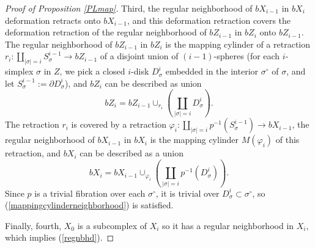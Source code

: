 \documentclass[11pt,letterpaper]{amsart}
\newtheorem*{remark}{Remark}
\begin{document}
\begin{proof}[Proof of Proposition \ref{PLmap}]
Third, the regular neighborhood of $bX_{i-1}$ in $bX_i$ deformation retracts onto $bX_{i-1}$, and this deformation retraction covers the deformation retraction of the regular neighborhood of $bZ_{i-1}$ in $bZ_i$ onto $bZ_{i-1}$. The regular neighborhood of $bZ_{i-1}$ in $bZ_i$ is the mapping cylinder of a retraction $r_i:\coprod_{|\sigma|=i}S_{\sigma}^{i-1}\rightarrow bZ_{i-1}$ of a disjoint union of $(i-1)$-spheres (for each $i$-simplex $\sigma$ in $Z$, we pick a closed $i$-disk $D^i_{\sigma}$ embedded in the interior $\sigma^{\circ}$ of $\sigma$, and let $S^{i-1}_{\sigma}:=\partial D^i_{\sigma}$), and $bZ_i$ can be described as union 
$$
bZ_i=bZ_{i-1}\cup_{r_i}\left(\coprod_{|\sigma|=i}D_{\sigma}^i\right).
$$
The retraction $r_i$ is covered by a retraction $\varphi_i:\coprod_{|\sigma|=i}p^{-1}(S_{\sigma}^{i-1})\rightarrow bX_{i-1}$, the regular neighborhood of $bX_{i-1}$ in $bX_i$ is the mapping cylinder $M(\varphi_i)$ of this retraction, and $bX_i$ can be described as a union 
$$
bX_i=bX_{i-1}\cup_{\varphi_i}\left(\coprod_{|\sigma|=i}p^{-1}(D_{\sigma}^i)\right).
$$
Since $p$ is a trivial fibration over each $\sigma^{\circ}$, it is trivial over $D_{\sigma}^i\subset\sigma^{\circ}$, so (\ref{mappingcylinderneighborhood}) is satisfied. 

Finally, fourth, $X_0$ is a subcomplex of $X_i$ so it has a regular neighborhood in $X_i$, which implies (\ref{regnbhd}).
\end{proof}




\end{document}
